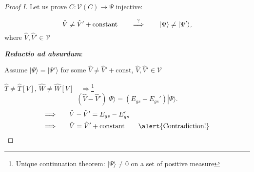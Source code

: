 \documentclass[compress]{beamer}
\newcommand*{\ket}[1]{|#1\rangle}
\begin{document}
\frame
 {
   \frametitle{}
 \begin{small}
 {\scriptsize
\begin{proof}[Proof I]
Let us prove $C:\mathcal{V}(C)\longrightarrow \Psi$  injective:

\begin{equation}
  \hat{V}\neq \hat{V}'+\text{constant} \qquad \stackrel{{\LARGE ?}}{\Longrightarrow } \qquad \ket{\Psi}\neq \ket{\Psi'}, \nonumber
\end{equation}
where $\hat{V}, \hat{V}' \in \mathcal{V}$
\vspace{0.5cm}

\textbf{\emph{Reductio ad absurdum}}: 
\vspace{1mm}

Assume $\ket{\Psi}=\ket{\Psi'}$ for some $\hat{V}\neq \hat{V}'+\text{const}$, $\hat{V}, \hat{V}' \in \mathcal{V}$ 

$\hat{T}\neq \hat{T}[V]$, $\hat{W}\neq \hat{W}[V] \quad \Longrightarrow $\footnote{Unique continuation theorem: $\ket{\Psi}\neq 0$ on a set of positive measure}
\begin{equation}
  \left(\hat{V}-\hat{V}'\right)\ket{\Psi }=\left(E_{gs}-E_{gs}'\right)\ket{\Psi }.\nonumber  
\end{equation}
\begin{align}
  \Longrightarrow \qquad & \hat{V}-\hat{V}'=E_{gs}-E_{gs}' \nonumber \\
  \Longrightarrow \qquad & \hat{V}=\hat{V}'+\text{constant} \qquad \alert{\text{Contradiction!}}\nonumber
\end{align}
\end{proof}

 }
 \end{small}
 }
\end{document}
